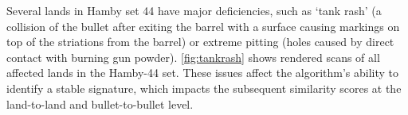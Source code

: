 \documentclass[doubleblind]{elsarticle}\usepackage[]{graphicx}\usepackage[]{color}
\newenvironment{knitrout}{}{} %
\begin{document}
Several lands in Hamby set 44 have major deficiencies,  such as `tank rash' (a collision of the bullet after exiting the barrel with a surface causing markings on top of the striations from the barrel) or extreme pitting (holes caused by direct contact with burning gun powder).
\autoref{fig:tankrash} shows rendered scans of all affected lands in the Hamby-44 set. These issues affect the algorithm's ability to identify a stable signature, which impacts the subsequent similarity scores at the land-to-land and bullet-to-bullet level.
\begin{knitrout}
\color{fgcolor}\begin{figure}
\newline
{}
\newline
{}
\newline

\end{figure}
\end{knitrout}
\end{document}
